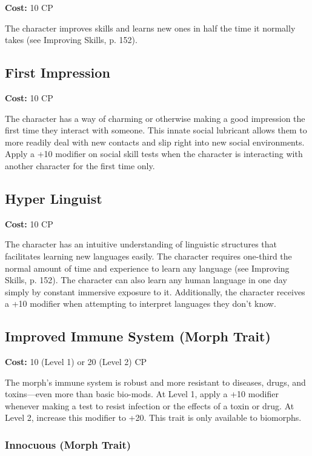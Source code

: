 \textbf{Cost:} 10 CP

The character improves skills and learns new ones in half the time it normally takes (see Improving Skills, p. 152).

\subsection{First Impression}
\label{sec:traits-first-impression}

\textbf{Cost:} 10 CP

The character has a way of charming or otherwise making a good impression the first time they interact with someone. This innate social lubricant allows them to more readily deal with new contacts and slip right into new social environments. Apply a +10 modifier on social skill tests when the character is interacting with another character for the first time only.

\subsection{Hyper Linguist}
\label{sec:traits-hyper-linguist}

\textbf{Cost:} 10 CP

The character has an intuitive understanding of linguistic structures that facilitates learning new languages easily. The character requires one-third the normal amount of time and experience to learn any language (see Improving Skills, p. 152). The character can also learn any human language in one day simply by constant immersive exposure to it. Additionally, the character receives a +10 modifier when attempting to interpret languages they don’t know.

\subsection{Improved Immune System (Morph Trait)}
\label{sec:traits-improved-immune-system}

\textbf{Cost:} 10 (Level 1) or 20 (Level 2) CP

The morph’s immune system is robust and more resistant to diseases, drugs, and toxins—even more than basic bio-mods. At Level 1, apply a +10 modifier whenever making a test to resist infection or the effects of a toxin or drug. At Level 2, increase this modifier to +20. This trait is only available to biomorphs.

\subsubsection{Innocuous (Morph Trait)}
\label{sec:traits-innocuous}

